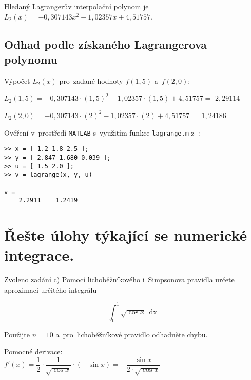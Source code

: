 \documentclass[a4paper,10pt]{article}
\def\doubleunderline#1{\underline{\underline{#1}}}
\def\d#1{\,\mathop{\mathrm{d}#1}}
\begin{document}
\par Hledaný Lagrangerův interpolační polynom je
\doubleunderline{$L_2(x)=-0,307143x^2-1,02357x+4,51757$}. \\

\subsection{Odhad podle získaného Lagrangerova polynomu}
\par Výpočet $L_2(x)$ pro~zadané hodnoty $f(1,5)$ a~$f(2,0)$: \\

\par $L_2(1,5) = -0,307143\cdot(1,5)^2-1,02357\cdot(1,5)+4,51757 =$
\doubleunderline{$2,29114$}

\par  $L_2(2,0) = -0,307143\cdot(2)^2-1,02357\cdot(2)+4,51757 =$
\doubleunderline{$1,24186$} \\

\par Ověření v~prostředí \texttt{MATLAB} s~využitím funkce \texttt{lagrange.m}
z~:

\begin{verbatim}
>> x = [ 1.2 1.8 2.5 ];
>> y = [ 2.847 1.680 0.039 ];
>> u = [ 1.5 2.0 ];
>> v = lagrange(x, y, u)

v =
    2.2911    1.2419
\end{verbatim}

\newpage
\section{Řešte úlohy týkající se numerické integrace.}

\par Zvoleno zadání c) Pomocí lichoběžníkového i~Simpsonova pravidla určete aproximaci
určitého integrálu

$$\int_{0}^{1}\sqrt{\cos{x}}\d{x}$$

\par Použijte $n=10$ a~pro~lichoběžníkové pravidlo odhadněte chybu. \\


\par Pomocné derivace: \\

$f'(x)=\dfrac{1}{2}\cdot\dfrac{1}{\sqrt{\cos{x}}}\cdot({-\sin{x}})=
-\dfrac{\sin{x}}{2\cdot\sqrt{\cos{x}}}$
\end{document}
